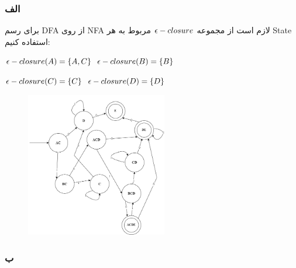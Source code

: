 \subsubsection*{الف}
برای رسم DFA از روی NFA لازم است از مجموعه ${\LARGE \epsilon} - closure$ مربوط به هر State استفاده کنیم:

\setLTR

${\LARGE \epsilon} - closure(A)= \left\{A,C\right\}$ \hspace{1em} ${\LARGE \epsilon} - closure(B)= \left\{B\right\}$ 

${\LARGE \epsilon} - closure(C)=\left\{C\right\}$  \hspace{1.9em}  ${\LARGE \epsilon} - closure(D)= \left\{D\right\}$ 

\setRTL

\begin{figure}[htbp]
	\centering
	\includegraphics[width=0.55\textwidth]{q3s3p1.png}
\end{figure}

\subsubsection*{ب}

